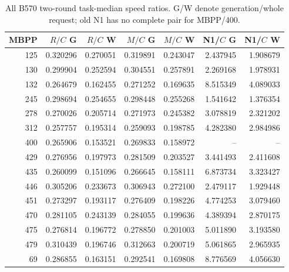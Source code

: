 \begingroup\small
\begin{table}[t]\centering
\caption{All B570 two-round task-median speed ratios. G/W denote generation/whole request; old N1 has no complete pair for MBPP/400.}\label{tab:b570_task_cost}
\begin{tabular}{@{}rrrrrrr@{}}
\toprule
MBPP & $R/C$ G & $R/C$ W & $M/C$ G & $M/C$ W & N1/$C$ G & N1/$C$ W\\\midrule
125 & 0.320296 & 0.270051 & 0.319891 & 0.243047 & 2.437945 & 1.908679\\
130 & 0.299904 & 0.252594 & 0.304551 & 0.257891 & 2.269168 & 1.978931\\
132 & 0.264679 & 0.162455 & 0.271252 & 0.169635 & 8.515349 & 4.089033\\
245 & 0.298694 & 0.254655 & 0.298448 & 0.255268 & 1.541642 & 1.376354\\
278 & 0.270026 & 0.205714 & 0.271973 & 0.245382 & 3.078819 & 2.321202\\
312 & 0.257757 & 0.195314 & 0.259093 & 0.198785 & 4.282380 & 2.984986\\
400 & 0.265906 & 0.153521 & 0.269833 & 0.158972 & -- & --\\
429 & 0.276956 & 0.197973 & 0.281509 & 0.203527 & 3.441493 & 2.411608\\
435 & 0.260099 & 0.151096 & 0.266645 & 0.158111 & 6.873734 & 3.323427\\
446 & 0.305206 & 0.233673 & 0.306943 & 0.272100 & 2.479117 & 1.929448\\
451 & 0.273297 & 0.193117 & 0.276409 & 0.198226 & 4.774253 & 3.079460\\
470 & 0.281105 & 0.243139 & 0.284055 & 0.199636 & 4.389394 & 2.870175\\
475 & 0.276814 & 0.196772 & 0.278850 & 0.201003 & 5.011890 & 3.193580\\
479 & 0.310439 & 0.196746 & 0.312663 & 0.200719 & 5.061865 & 2.965935\\
69 & 0.286855 & 0.163151 & 0.292541 & 0.169808 & 8.776569 & 4.056630\\
\bottomrule\end{tabular}
\end{table}

\endgroup
